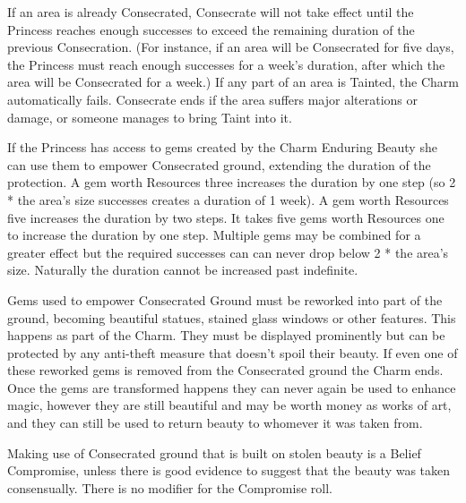 \noindent  If an area is already Consecrated, Consecrate will not take effect until the Princess reaches enough successes to exceed the remaining duration of the previous Consecration. (For instance, if an area will be Consecrated for five days, the Princess must reach enough successes for a week's duration, after which the area will be Consecrated for a week.) If any part of an area is Tainted, the Charm automatically fails. Consecrate ends if the area suffers major alterations or damage, or someone manages to bring Taint into it.

If the Princess has access to gems created by the Charm Enduring Beauty she can use them to empower Consecrated ground, extending the duration of the protection. A gem worth Resources three increases the duration by one step (so 2 * the area's size successes creates a duration of 1 week). A gem worth Resources five increases the duration by two steps. It takes five gems worth Resources one to increase the duration by one step. Multiple gems may be combined for a greater effect but the required successes can can never drop below 2 * the area's size. Naturally the duration cannot be increased past indefinite. 

Gems used to empower Consecrated Ground must be reworked into part of the ground, becoming beautiful statues, stained glass windows or other features. This happens as part of the Charm. They must be displayed prominently but can be protected by any anti-theft measure that doesn’t spoil their beauty. If even one of these reworked gems is removed from the Consecrated ground the Charm ends. Once the gems are transformed happens they can never again be used to enhance magic, however they are still beautiful and may be worth money as works of art, and they can still be used to return beauty to whomever it was taken from.

Making use of Consecrated ground that is built on stolen beauty is a Belief Compromise, unless there is good evidence to suggest that the beauty was taken consensually. There is no modifier for the Compromise roll.

